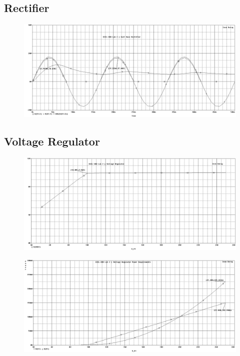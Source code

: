 \subsection{Rectifier}
\newcommand{\pwidth}{.95\textwidth}

\begin{figure}[H]
	\centering
	\includegraphics[width=\pwidth]{img/plot/halfwavePlot.PNG}
	\parbox{\pwidth}{
	\caption{}
	\label{fig:halfwavePlot}}
\end{figure}

\subsection{Voltage Regulator}
\begin{figure}[H]
	\centering
	\includegraphics[width=\pwidth]{img/plot/zenerPlot.PNG}
	\parbox{\pwidth}{
	\caption{}
	\label{fig:zenerPlotV}}
\end{figure}

\begin{figure}[H]
	\centering
	\includegraphics[width=\pwidth]{img/plot/zenerPowerPlot.PNG}
	\parbox{\pwidth}{
	\caption{}
	\label{fig:zenerPlotW}}
\end{figure}

